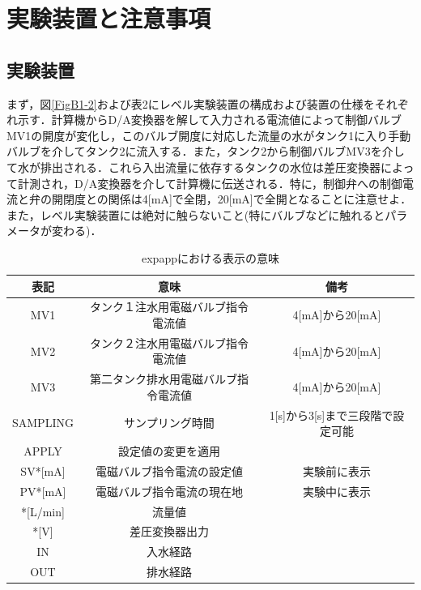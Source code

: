 \documentclass[12pt]{jsarticle}
\begin{document}
\section{実験装置と注意事項}
\subsection{実験装置}

まず，図\ref{FigB1-2}および表2にレベル実験装置の構成および装置の仕様をそれぞれ示す．計算機からD/A変換器を解して入力される電流値によって制御バルブMV1の開度が変化し，このバルブ開度に対応した流量の水がタンク1に入り手動バルブを介してタンク2に流入する．また，タンク2から制御バルブMV3を介して水が排出される．これら入出流量に依存するタンクの水位は差圧変換器によって計測され，D/A変換器を介して計算機に伝送される．特に，制御弁への制御電流と弁の開閉度との関係は4[mA]で全閉，20[mA]で全開となることに注意せよ．また，レベル実験装置には絶対に触らないこと(特にバルブなどに触れるとパラメータが変わる)．
\begin{table}[b]
  \label{TableB1-1}
  \caption{expappにおける表示の意味}
  \begin{tabular}{c|c|c} \hline
    表記 & 意味 & 備考\\ \hline \hline
    MV1 & タンク１注水用電磁バルブ指令電流値 & 4[mA]から20[mA] \\ \hline
    MV2 & タンク２注水用電磁バルブ指令電流値 & 4[mA]から20[mA] \\ \hline
    MV3 & 第二タンク排水用電磁バルブ指令電流値 & 4[mA]から20[mA] \\ \hline
    SAMPLING & サンプリング時間 & 1[s]から3[s]まで三段階で設定可能 \\ \hline
    APPLY & 設定値の変更を適用 & \\ \hline
    SV*[mA] & 電磁バルブ指令電流の設定値 & 実験前に表示 \\ \hline
    PV*[mA] & 電磁バルブ指令電流の現在地 & 実験中に表示 \\ \hline
    *[L/min] & 流量値 & \\ \hline
    *[V] & 差圧変換器出力 & \\ \hline
    IN & 入水経路 & \\ \hline
    OUT & 排水経路 & \\ \hline
  \end{tabular}
\end{table}
\end{document}
